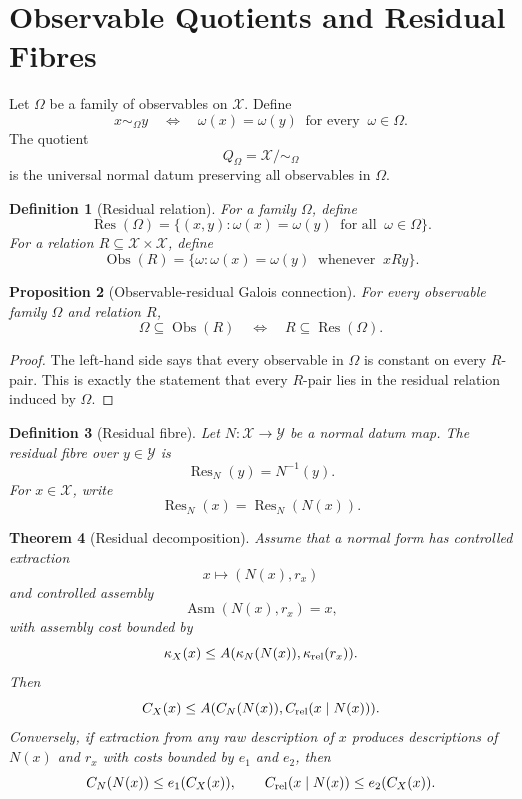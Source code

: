 \documentclass[11pt]{article}
\newtheorem{theorem}{Theorem}[section]
\newtheorem{proposition}[theorem]{Proposition}
\newtheorem{definition}[theorem]{Definition}
\DeclareMathOperator{\Obs}{Obs}
\DeclareMathOperator{\Res}{Res}
\begin{document}
\section{Observable Quotients and Residual Fibres}

Let \(\Omega\) be a family of observables on \(\mathcal X\). Define
\[
x\sim_\Omega y
\quad\Longleftrightarrow\quad
\omega(x)=\omega(y)\ \text{ for every }\ \omega\in\Omega.
\]
The quotient
\[
Q_\Omega=\mathcal X/{\sim_\Omega}
\]
is the universal normal datum preserving all observables in \(\Omega\).

\begin{definition}[Residual relation]
For a family \(\Omega\), define
\[
\Res(\Omega)=
\{(x,y):\omega(x)=\omega(y)\ \text{ for all }\ \omega\in\Omega\}.
\]
For a relation \(R\subseteq\mathcal X\times\mathcal X\), define
\[
\Obs(R)=
\{\omega:\omega(x)=\omega(y)\ \text{ whenever }\ xRy\}.
\]
\end{definition}

\begin{proposition}[Observable-residual Galois connection]
For every observable family \(\Omega\) and relation \(R\),
\[
\Omega\subseteq \Obs(R)
\quad\Longleftrightarrow\quad
R\subseteq \Res(\Omega).
\]
\end{proposition}

\begin{proof}
The left-hand side says that every observable in \(\Omega\) is constant on every \(R\)-pair. This is exactly the statement that every \(R\)-pair lies in the residual relation induced by \(\Omega\).
\end{proof}

\begin{definition}[Residual fibre]
Let \(N:\mathcal X\to\mathcal Y\) be a normal datum map. The residual fibre over \(y\in\mathcal Y\) is
\[
\Res_N(y)=N^{-1}(y).
\]
For \(x\in\mathcal X\), write
\[
\Res_N(x)=\Res_N(N(x)).
\]
\end{definition}

\begin{theorem}[Residual decomposition]
Assume that a normal form has controlled extraction
\[
x\mapsto (N(x),r_x)
\]
and controlled assembly
\[
\operatorname{Asm}(N(x),r_x)=x,
\]
with assembly cost bounded by
\[
\kappa_X(x)\leq A(\kappa_N(N(x)),\kappa_{\rm rel}(r_x)).
\]
Then
\[
C_X(x)\leq A(C_N(N(x)),C_{\rm rel}(x\mid N(x))).
\]
Conversely, if extraction from any raw description of \(x\) produces descriptions of \(N(x)\) and \(r_x\) with costs bounded by \(e_1\) and \(e_2\), then
\[
C_N(N(x))\leq e_1(C_X(x)),
\qquad
C_{\rm rel}(x\mid N(x))\leq e_2(C_X(x)).
\]
\end{theorem}
\end{document}
